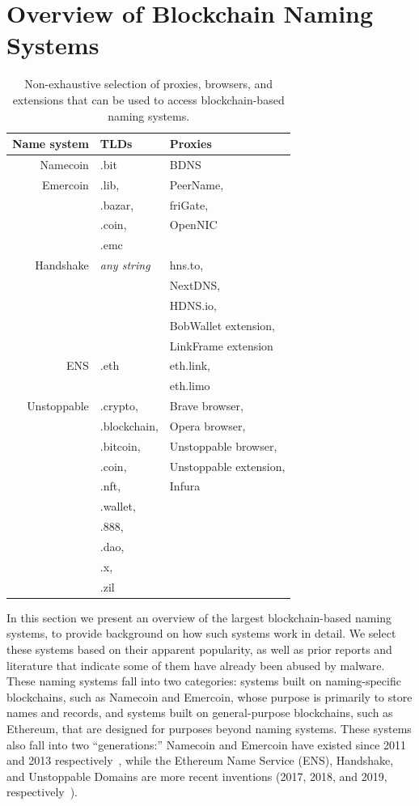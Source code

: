 \section{Overview of Blockchain Naming Systems}

\begin{table}
	\begin{tabular}{r l l}
		\toprule
		Name system & TLDs & Proxies \\
		\midrule
		Namecoin & .bit & BDNS \\
		Emercoin & .lib, & PeerName,  \\
		& .bazar, & friGate, \\
		& .coin, & OpenNIC \\
		& .emc & \\
		Handshake & \emph{any string} & hns.to, \\
		& & NextDNS, \\
		& & HDNS.io,\\
		& & BobWallet extension, \\
		& & LinkFrame extension \\
		ENS & .eth & eth.link, \\
		& & eth.limo \\
		Unstoppable & .crypto, & Brave browser, \\
		& .blockchain, & Opera browser, \\
		& .bitcoin, & Unstoppable browser, \\
		& .coin, & Unstoppable extension, \\
		& .nft, & Infura\\
		& .wallet, & \\
		& .888, & \\
		& .dao, & \\
		& .x, & \\
		& .zil & \\
		\bottomrule
	\end{tabular}
	\caption{Non-exhaustive selection of proxies, browsers, 
		and extensions 
		that can be used to access blockchain-based naming 
		systems. }
	\label{tab:proxies_and_tlds}
\end{table}

In this section we present an overview of the largest blockchain-based naming 
systems, to provide background on how such systems work in detail. We select 
these systems based on their apparent popularity, as well as 
prior reports and literature that indicate some of them have already been 
abused by malware. These naming systems fall into two categories: systems built 
on naming-specific blockchains, such as Namecoin and Emercoin, whose purpose is 
primarily to store names and records, and systems built on general-purpose 
blockchains, such as Ethereum, that are designed for purposes beyond naming 
systems. These systems also fall into two ``generations:'' Namecoin and 
Emercoin have existed since 2011 and 2013 
respectively~\cite{namecoin, emercoin}, while the Ethereum 
Name Service (ENS), Handshake, and Unstoppable 
Domains are more recent inventions (2017, 2018, and 2019, 
respectively~\cite{ens_website, handshake_website, 
first_ud_txn}). 

